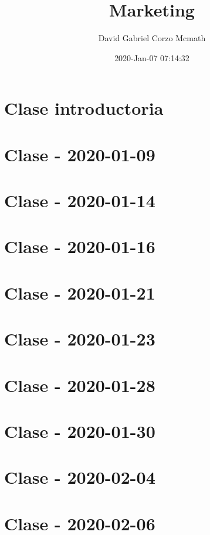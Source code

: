 \documentclass[openany]{book}
\title{Marketing}
\author{David Gabriel Corzo Mcmath}
\date{2020-Jan-07 07:14:32}
\begin{document}
\maketitle
\tableofcontents

\chapter{Clase introductoria}


\chapter{Clase - 2020-01-09}


\chapter{Clase - 2020-01-14}


\chapter{Clase - 2020-01-16}


\chapter{Clase - 2020-01-21}


\chapter{Clase - 2020-01-23}


\chapter{Clase - 2020-01-28}


\chapter{Clase - 2020-01-30}


\chapter{Clase - 2020-02-04}


\chapter{Clase - 2020-02-06}

\end{document}
